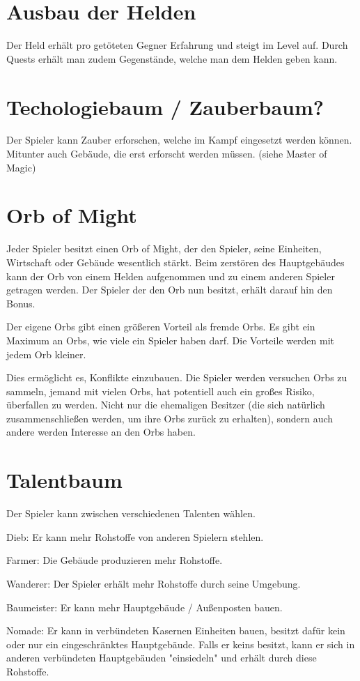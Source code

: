 \section{Ausbau der Helden}
Der Held erhält pro getöteten Gegner Erfahrung und steigt im Level auf. Durch Quests erhält man zudem Gegenstände, welche man dem Helden geben kann. 

\section{Techologiebaum / Zauberbaum?}
Der Spieler kann Zauber erforschen, welche im Kampf eingesetzt werden können. Mitunter auch Gebäude, die erst erforscht werden müssen.
(siehe Master of Magic)

\section{Orb of Might}
Jeder Spieler besitzt einen Orb of Might, der den Spieler, seine Einheiten, Wirtschaft oder Gebäude wesentlich stärkt. Beim zerstören des Hauptgebäudes kann der Orb von einem Helden aufgenommen und zu einem anderen Spieler getragen werden. Der Spieler der den Orb nun besitzt, erhält darauf hin den Bonus.

Der eigene Orbs gibt einen größeren Vorteil als fremde Orbs. Es gibt ein Maximum an Orbs, wie viele ein Spieler haben darf. Die Vorteile werden mit jedem Orb kleiner.

Dies ermöglicht es, Konflikte einzubauen. Die Spieler werden versuchen Orbs zu sammeln, jemand mit vielen Orbs, hat potentiell auch ein großes Risiko, überfallen zu werden. Nicht nur die ehemaligen Besitzer (die sich natürlich zusammenschließen werden, um ihre Orbs zurück zu erhalten), sondern auch andere werden Interesse an den Orbs haben.

\section{Talentbaum}
Der Spieler kann zwischen verschiedenen Talenten wählen.

Dieb: Er kann mehr Rohstoffe von anderen Spielern stehlen.

Farmer: Die Gebäude produzieren mehr Rohstoffe.

Wanderer: Der Spieler erhält mehr Rohstoffe durch seine Umgebung.

Baumeister: Er kann mehr Hauptgebäude / Außenposten bauen.

Nomade: Er kann in verbündeten Kasernen Einheiten bauen, besitzt dafür kein oder nur ein eingeschränktes Hauptgebäude. Falls er keins besitzt, kann er sich in anderen verbündeten Hauptgebäuden "einsiedeln" und erhält durch diese Rohstoffe.

